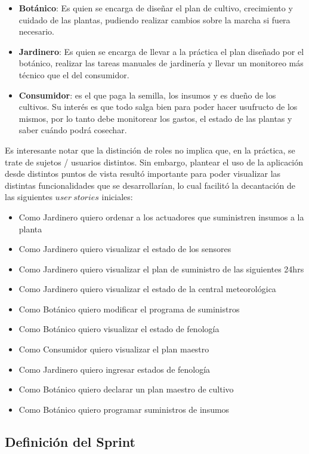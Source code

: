 \begin{itemize}
\item \textbf{Botánico}: Es quien se encarga de diseñar el plan de cultivo, crecimiento y cuidado de las plantas, pudiendo realizar cambios sobre la marcha si fuera necesario.
\item \textbf{Jardinero}: Es quien se encarga de llevar a la práctica el plan diseñado por el botánico, realizar las tareas manuales de jardinería y llevar un monitoreo más técnico que el del consumidor.
\item \textbf{Consumidor}: es el que paga la semilla, los insumos y es dueño de los cultivos. Su interés es que todo salga bien para poder hacer usufructo de los mismos, por lo tanto debe monitorear los gastos, el estado de las plantas y saber cuándo podrá cosechar.
\end{itemize}

Es interesante notar que la distinción de roles no implica que, en la práctica, se trate de sujetos / usuarios distintos. Sin embargo, plantear el uso de la aplicación desde distintos puntos de vista resultó importante para poder visualizar las distintas funcionalidades que se desarrollarían, lo cual facilitó la decantación de las siguientes $user\ stories$ iniciales:

\begin{itemize}
\item Como Jardinero quiero ordenar a los actuadores que suministren insumos a la planta
\item Como Jardinero quiero visualizar el estado de los sensores
\item Como Jardinero quiero visualizar el plan de suministro de las siguientes 24hrs
\item Como Jardinero quiero visualizar el estado de la central meteorológica	
\item Como Botánico quiero modificar el programa de suministros 
\item Como Botánico quiero visualizar el estado de fenología	
\item Como Consumidor quiero visualizar el plan maestro	
\item Como Jardinero quiero ingresar estados de fenología	
\item Como Botánico quiero declarar un plan maestro de cultivo
\item Como Botánico quiero programar suministros de insumos
\end{itemize}

\subsection{Definición del Sprint}

